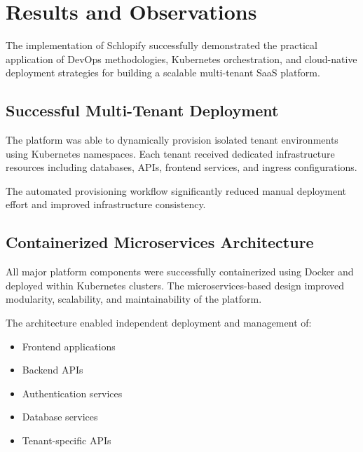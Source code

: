 \documentclass[12pt,a4paper]{report}
\begin{document}
\newpage


\chapter{Results and Observations}

The implementation of Schlopify successfully demonstrated the practical application of DevOps methodologies, Kubernetes orchestration, and cloud-native deployment strategies for building a scalable multi-tenant SaaS platform.

\section{Successful Multi-Tenant Deployment}

The platform was able to dynamically provision isolated tenant environments using Kubernetes namespaces. Each tenant received dedicated infrastructure resources including databases, APIs, frontend services, and ingress configurations.

The automated provisioning workflow significantly reduced manual deployment effort and improved infrastructure consistency.

\section{Containerized Microservices Architecture}

All major platform components were successfully containerized using Docker and deployed within Kubernetes clusters. The microservices-based design improved modularity, scalability, and maintainability of the platform.

The architecture enabled independent deployment and management of:

\begin{itemize}

    \item Frontend applications
    \item Backend APIs
    \item Authentication services
    \item Database services
    \item Tenant-specific APIs

\end{itemize}
\end{document}
